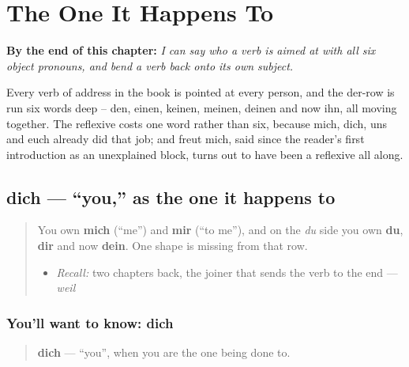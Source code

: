
\chapter{The One It Happens To}
\label{ch:ge-objektpronomen}

\begin{chapteropening}
\textbf{By the end of this chapter:} \emph{I can say who a verb is aimed at with all six object pronouns, and bend a verb back onto its own subject.}

Every verb of address in the book is pointed at every person, and the der-row is run six words deep -- den, einen, keinen, meinen, deinen and now ihn, all moving together. The reflexive costs one word rather than six, because mich, dich, uns and euch already did that job; and freut mich, said since the reader's first introduction as an unexplained block, turns out to have been a reflexive all along.
\end{chapteropening}

\section[dich]{dich — \textquotedblleft{}you,\textquotedblright{} as the one it happens to}

\label{lesson:GE-C37-dich}



\begin{quote}
You own \textbf{mich} (\textquotedblleft{}me\textquotedblright{}) and \textbf{mir} (\textquotedblleft{}to me\textquotedblright{}), and on the \emph{du} side you own \textbf{du}, \textbf{dir} and now \textbf{dein}. One shape is missing from that row.

\begin{itemize}
\raggedright
  \item \emph{Recall:} two chapters back, the joiner that sends the verb to the end — \emph{weil}
\end{itemize}
\end{quote}

\subsection*{You'll want to know: dich}
\begin{quote}
\textbf{dich} — \textquotedblleft{}you\textquotedblright{}, when you are the one being done to.
\end{quote}


